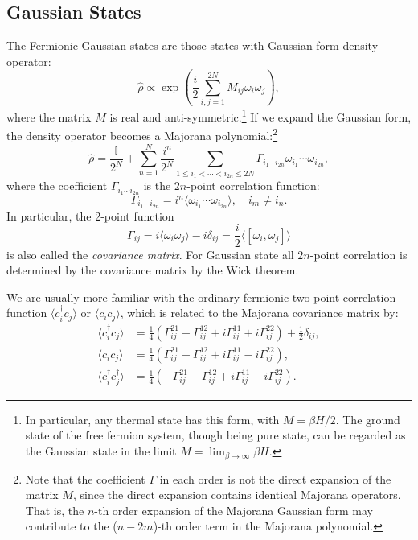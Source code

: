\subsection{Gaussian States}
The Fermionic Gaussian states are those states with Gaussian form density operator:
\begin{equation}
	\hat \rho \propto \exp \left(\frac{i}{2}\sum_{i,j=1}^{2N}M_{ij}\omega_i \omega_j \right),
\end{equation}
where the matrix $M$ is real and anti-symmetric.\footnote{In particular, any thermal state has this form, with $M = \beta H/2$. The ground state of the free fermion system, though being pure state, can be regarded as the Gaussian state in the limit $M = \lim_{\beta \rightarrow \infty} \beta H$.}
If we expand the Gaussian form, the density operator becomes a Majorana polynomial:\footnote{Note that the coefficient $\Gamma$ in each order is not the direct expansion of the matrix $M$, since the direct expansion contains identical Majorana operators. That is, the $n$-th order expansion of the Majorana Gaussian form may contribute to the ($n-2m$)-th order term in the Majorana polynomial.}
\begin{equation}
	\hat{\rho} = \frac{\mathbb{I}}{2^N} + \sum_{n=1}^{N}\frac{i^n}{2^N}\sum_{1\le i_{1}<\cdots<i_{2n} \le 2N}\Gamma_{i_{1}\cdots i_{2n}} \omega_{i_1}\cdots\omega_{i_{2n}},
\end{equation}
where the coefficient $\Gamma_{i_1 \cdots i_{2n}}$ is the $2n$-point correlation function:
\begin{equation}
	\Gamma_{i_1 \cdots i_{2n}} = i^n \langle \omega_{i_1} \cdots \omega_{i_{2n}}\rangle, \quad i_m \ne i_n.
\end{equation}
In particular, the 2-point function 
\begin{equation}
	\Gamma_{ij} = i\langle \omega_i \omega_j\rangle - i\delta_{ij} = \frac{i}{2}\langle [\omega_i, \omega_j]\rangle
\end{equation}
is also called the \textit{covariance matrix}. 
For Gaussian state all $2n$-point correlation is determined by the covariance matrix by the Wick theorem.
\begin{framedrmk}
We are usually more familiar with the ordinary fermionic two-point correlation function $\langle c^\dagger_i c_j\rangle$ or $\langle c_i c_j\rangle$, which is related to the Majorana covariance matrix by:
\begin{equation}
\begin{aligned}
	\langle c_i^\dagger c_j\rangle &= \frac{1}{4}(
		\Gamma^{21}_{ij} - \Gamma^{12}_{ij} + 
		i \Gamma^{11}_{ij} + i \Gamma^{22}_{ij})
		+\frac{1}{2}\mathbb \delta_{ij}, \\
	\langle c_i c_j\rangle &= \frac{1}{4}(
		\Gamma^{21}_{ij} + \Gamma^{12}_{ij} + 
		i \Gamma^{11}_{ij} - i \Gamma^{22}_{ij}), \\
	\langle c_i^\dagger c_j^\dagger\rangle &= \frac{1}{4}(
		-\Gamma^{21}_{ij} - \Gamma^{12}_{ij} + 
		i \Gamma^{11}_{ij} - i \Gamma^{22}_{ij}).
\end{aligned}
\end{equation}
\end{framedrmk}

